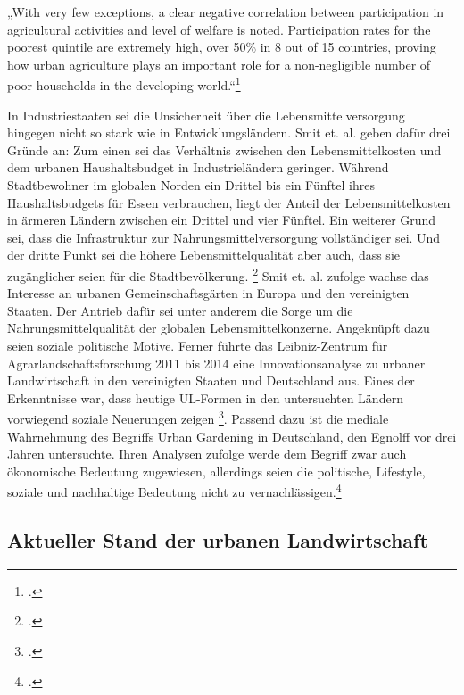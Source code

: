 \documentclass{scrartcl}
\begin{document}
\begin{displayquote}
„With very few exceptions, a clear negative correlation between participation in agricultural activities and level of welfare is noted. Participation rates for the poorest quintile are extremely high, over 50\% in 8 out of 15 countries, proving how urban agriculture plays an important role for a non-negligible number of poor households in the developing world.“\footcite[S.268]{Zezza2010UrbanCountries}
\end{displayquote}
In Industriestaaten sei die Unsicherheit über die Lebensmittelversorgung hingegen nicht so stark wie in Entwicklungsländern. Smit et. al. geben dafür drei Gründe an: Zum einen sei das Verhältnis zwischen den Lebensmittelkosten und dem urbanen Haushaltsbudget in Industrieländern geringer. Während Stadtbewohner im globalen Norden ein Drittel bis ein Fünftel ihres Haushaltsbudgets für Essen verbrauchen, liegt der Anteil der Lebensmittelkosten in ärmeren Ländern zwischen ein Drittel und vier Fünftel. Ein weiterer Grund sei, dass die Infrastruktur zur Nahrungsmittelversorgung vollständiger sei. Und der dritte Punkt sei die höhere Lebensmittelqualität aber auch, dass sie zugänglicher seien für die Stadtbevölkerung. \footcites[Vgl.][S.27]{SmitUrbanToday} Smit et. al. zufolge wachse das Interesse an urbanen Gemeinschaftsgärten in Europa und den vereinigten Staaten. Der Antrieb dafür sei unter anderem die Sorge um die Nahrungsmittelqualität der globalen Lebensmittelkonzerne. Angeknüpft dazu seien soziale politische Motive. Ferner führte das Leibniz-Zentrum für Agrarlandschaftsforschung 2011 bis 2014 eine Innovationsanalyse zu urbaner Landwirtschaft in den vereinigten Staaten und Deutschland aus. Eines der Erkenntnisse war, dass heutige UL-Formen in den untersuchten Ländern vorwiegend soziale Neuerungen zeigen \footcite{Berges2014UrbaneStadt}. Passend dazu ist die mediale Wahrnehmung des Begriffs Urban Gardening in Deutschland, den Egnolff vor drei Jahren untersuchte. Ihren Analysen zufolge werde dem Begriff zwar auch ökonomische Bedeutung zugewiesen, allerdings seien die politische, Lifestyle, soziale und nachhaltige Bedeutung nicht zu vernachlässigen.\footcite[Vgl.][S.119ff]{Egnolff2015DieIdeal}



\subsection{Aktueller Stand der urbanen Landwirtschaft}
\end{document}
